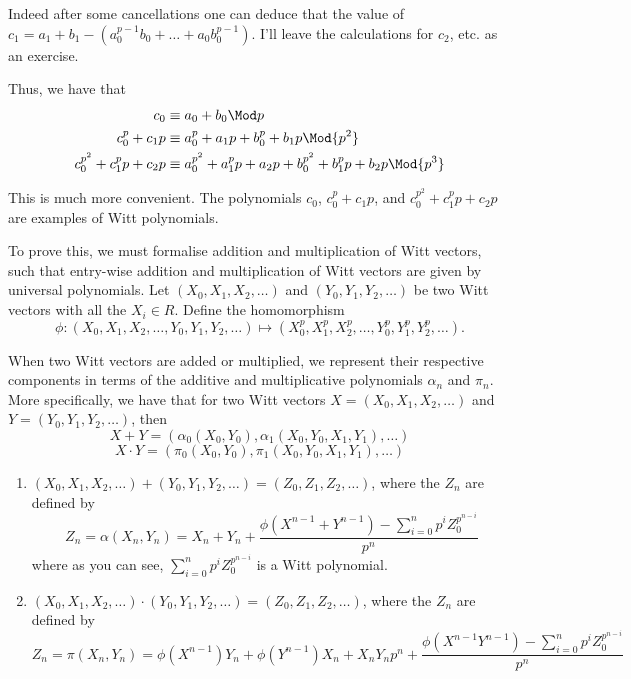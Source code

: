 \documentclass[a4paper, 12pt,oneside,openany]{book}
\begin{document}
Indeed after some cancellations one can deduce that the value of $c_1=a_1+b_1-(a_0^{p-1}b_0+\dots+a_0b_0^{p-1}).$ I'll leave the calculations for $c_2$, etc. as an exercise.

Thus, we have that \begin{align*} c_0&\equiv a_0+b_0 \Mod p \\ c_0^p+c_1p &\equiv a_0^p+a_1p+b_0^p+b_1p \Mod{p^2} \\ c_0^{p^2}+c_1^pp+c_2p&\equiv a_0^{p^2}+a_1^pp+a_2p+b_0^{p^2}+b_1^pp+b_2p \Mod {p^3} \end{align*}

This is much more convenient. The polynomials $c_0$, $c_0^p+c_1p$, and $c_0^{p^2}+c_1^pp+c_2p$ are examples of Witt polynomials. 



To prove this, we must formalise addition and multiplication of Witt vectors, such that entry-wise addition and multiplication of Witt vectors are given by universal polynomials. Let $(X_0, X_1, X_2, \dots)$ and $(Y_0, Y_1, Y_2, \dots)$ be two Witt vectors with all the $X_i \in R$. Define the homomorphism $$\phi: (X_0, X_1, X_2, \dots, Y_0, Y_1, Y_2, \dots) \mapsto (X_0^p, X_1^p, X_2^p, \dots, Y_0^p, Y_1^p, Y_2^p, \dots).$$ 

When two Witt vectors are added or multiplied, we represent their respective components in terms of the additive and multiplicative polynomials $\alpha_n$ and $\pi_n$. More specifically, we have that for two Witt vectors $X=(X_0, X_1, X_2, \dots)$ and $Y=(Y_0, Y_1, Y_2, \dots)$, then $$X+Y=(\alpha_0(X_0, Y_0), \alpha_1(X_0, Y_0, X_1, Y_1), \dots)$$ $$X \cdot Y =(\pi_0(X_0, Y_0), \pi_1(X_0, Y_0, X_1, Y_1), \dots)$$

\begin{enumerate}
	\item $(X_0, X_1, X_2, \dots)+(Y_0, Y_1, Y_2, \dots)=(Z_0, Z_1, Z_2, \dots)$, where the $Z_n$ are defined by $$Z_n=\alpha(X_n, Y_n)=X_n+Y_n+\frac{\phi(X^{n-1}+Y^{n-1})-\sum\limits_{i=0}^n p^i Z_0^{p^{n-i}}}{p^n}$$ where as you can see, $\sum\limits_{i=0}^n p^i Z_0^{p^{n-i}}$ is a Witt polynomial.
	\item $(X_0, X_1, X_2, \dots)\cdot(Y_0, Y_1, Y_2, \dots)=(Z_0, Z_1, Z_2, \dots)$, where the $Z_n$ are defined by $$Z_n=\pi(X_n, Y_n)=\phi(X^{n-1})Y_n+\phi(Y^{n-1})X_n+X_nY_np^n+\frac{\phi(X^{n-1}Y^{n-1})-\sum\limits_{i=0}^n p^i Z_0^{p^{n-i}}}{p^n}$$
\end{enumerate}
\end{document}
